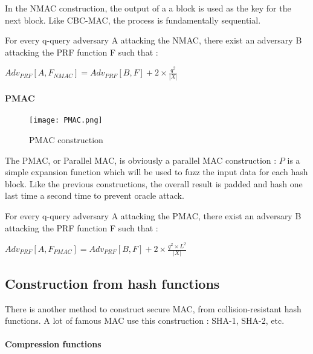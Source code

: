 In the NMAC construction, the output of a a block is used as the key for the next block. Like CBC-MAC, the process is fundamentally sequential.


\begin{mytheorem}
	For every q-query adversary A attacking the NMAC, there exist an adversary B attacking the PRF function F such that : 
	\begin{flushright}
 		$Adv_{PRF}[A,F_{NMAC}] = Adv_{PRF}[B, F] + 2\times \frac{q^2}{|X|}$	
	\end{flushright}
\end{mytheorem}



\paragraph{PMAC}

\begin{figure}[h!]
	\centering
		\texttt{[image: PMAC.png]}
	\caption{PMAC construction}
	\label{fig:PMACConstruction}
\end{figure}

The PMAC, or Parallel MAC, is obviously a parallel MAC construction : $P$ is a simple expansion function which will be used to fuzz the input data for each hash block. Like the previous constructions, the overall result is padded and hash one last time a second time to prevent oracle attack.

\begin{mytheorem}
	For every q-query adversary A attacking the PMAC, there exist an adversary B attacking the PRF function F such that : 
	\begin{flushright}
 		$Adv_{PRF}[A,F_{PMAC}] = Adv_{PRF}[B, F] + 2\times \frac{q^2\times L^2}{|X|}$	
	\end{flushright}
\end{mytheorem}



\subsection{Construction from hash functions}

There is another method to construct secure MAC, from collision-resistant hash functions. A lot of famous MAC use this construction : SHA-1, SHA-2, etc.

\paragraph{Compression functions}

